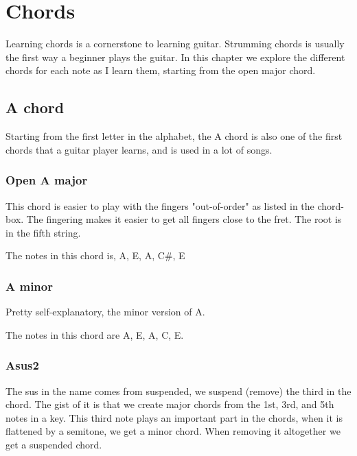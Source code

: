 \documentclass[11pt]{book}
\begin{document}
    \chapter{Chords}
    Learning chords is a cornerstone to learning guitar.
    Strumming chords is usually the first way a beginner plays the guitar.
    In this chapter we explore the different chords for each note as I learn them, starting from the open major chord.


    \section{A chord}
    Starting from the first letter in the alphabet, the A chord is also one of the first chords that a guitar player learns,
    and is used in a lot of songs.

    \subsection{Open A major}
    This chord is easier to play with the fingers "out-of-order" as listed in the chord-box.
    The fingering makes it easier to get all fingers close to the fret.
    The root is in the fifth string.

    \chordscheme[
    name   = A,
    finger = {2/4:2,2/3:1,2/2:3},
    ring   = {5,1},
    mute   = {6}
    ]

    The notes in this chord is, A, E, A, C\#, E

    \subsection{A minor}
    Pretty self-explanatory, the minor version of A.

    \chordscheme[
    name = Am,
    finger = {2/4:2, 2/3:3, 1/2:1},
    ring = {5,1},
    mute = {6}
    ]

    The notes in this chord are A, E, A, C, E.

    \subsection{Asus2}
    The sus in the name comes from suspended, we suspend (remove) the third in the chord.
    The gist of it is that we create major chords from the 1st, 3rd, and 5th notes in a key.
    This third note plays an important part in the chords, when it is flattened by a semitone, we get a minor chord.
    When removing it altogether we get a suspended chord.
\end{document}
